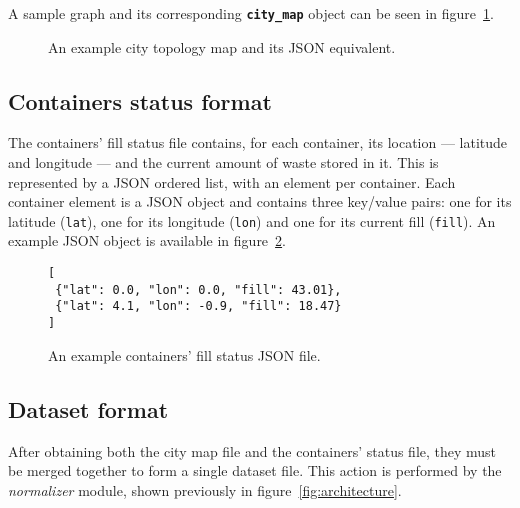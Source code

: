 A sample graph and its corresponding \textbf{\texttt{city\_map}} object can be
seen in figure~\ref{fig:city-map-example}.


\begin{figure}[th]
  \begin{center}
    \leavevmode
    
    \caption{An example city topology map and its JSON equivalent.}
    \label{fig:city-map-example}
  \end{center}
\end{figure}



\subsection{Containers status format}
\label{section:container-format}

The containers' fill status file contains, for each container, its location ---
latitude and longitude --- and the current amount of waste stored in it. This
is represented by a JSON ordered list, with an element per container. Each
container element is a JSON object and contains three key/value pairs: one for
its latitude (\texttt{lat}), one for its longitude (\texttt{lon}) and one for
its current fill (\texttt{fill}). An example JSON object is available in
figure~\ref{fig:containers-example}.

\begin{figure}[th]
  \begin{center}
    \leavevmode
      \begin{minipage}{9cm}
    \begin{verbatim}
[
 {"lat": 0.0, "lon": 0.0, "fill": 43.01},
 {"lat": 4.1, "lon": -0.9, "fill": 18.47}
]
    \end{verbatim}
    \end{minipage}
    \caption{An example containers' fill status JSON file.}
    \label{fig:containers-example}
  \end{center}
\end{figure}





\subsection{Dataset format}
\label{section:dataset-format}

After obtaining both the city map file and the containers' status file, they
must be merged together to form a single dataset file. This action is performed
by the \textit{normalizer} module, shown previously in figure~\ref{fig:architecture}.

